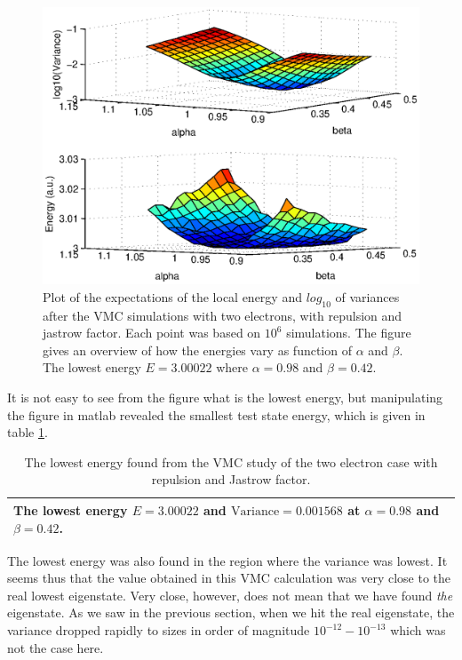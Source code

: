 \begin{figure}[h!]
	\centering
	\includegraphics[width=\textwidth]{results/N2_rep.eps}
	\caption{Plot of the expectations of the local energy and $log_{10}$ of variances after the VMC simulations with two electrons, with repulsion and jastrow factor. 
	Each point was based on $10^6$ simulations. 
	The figure gives an overview of how the energies vary as function of $\alpha$ and $\beta$.
	The lowest energy $E= 3.00022$ where $\alpha = 0.98$ and $\beta = 0.42$.}
	\label{fig:N2_rep}
\end{figure}

It is not easy to see from the figure what is the lowest energy, but manipulating the figure in matlab revealed the smallest test state energy, which is given in table \ref{tab:N2_rep}.

\begin{table}[h!]
		\centering 
	\begin{tabular}{l}
		\toprule
		The lowest energy $E=3.00022$ and $\textrm{Variance} = 0.001568$ at $\alpha = 0.98$ and $\beta = 0.42$. \\
		\bottomrule
	\end{tabular}
	\caption{The lowest energy found from the VMC study of the two electron case with repulsion and Jastrow factor.}
	\label{tab:N2_rep}
\end{table}

The lowest energy was also found in the region where the variance was lowest. 
It seems thus that the value obtained in this VMC calculation was very close to the real lowest eigenstate. 
Very close, however, does not mean that we have found \textit{the} eigenstate. 
As we saw in the previous section, when we hit the real eigenstate, the variance dropped rapidly to sizes in order of magnitude $10^{-12}-10^{-13}$ which was not the case here. 



